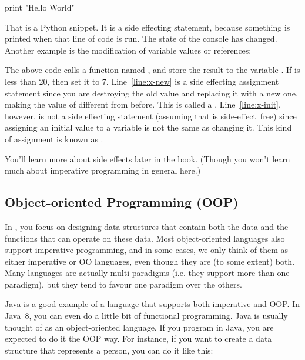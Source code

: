\begin{Python}
print "Hello World"
\end{Python}

That is a Python snippet. It is a side effecting statement, because something is printed when that line of code is run. The state of the console has changed. Another example is the modification of variable values or references: 

\begin{Python}
x = function_that_returns_int() (*@\label{line:x-init}@*)
if x < 20:
	x = 7 (*@{\label{line:x-new}@*)
\end{Python}

The above code calls a function named , and store the result to the variable . If  is less than 20, then set it to 7. Line~\ref{line:x-new} is a side effecting assignment statement since you are destroying the old value and replacing it with a new one, making the value of  different from before. This is called a . Line~\ref{line:x-init}, however, is not a side effecting statement (assuming that  is side-effect~free) since assigning an initial value to a variable is not the same as changing it. This kind of assignment is known as .

You'll learn more about side effects later in the book. (Though you won't learn much about imperative programming in general here.)

\subsection{Object-oriented Programming (OOP)}
In , you focus on designing data structures that contain both the data and the functions that can operate on these data. Most object-oriented languages also support imperative programming, and in some cases, we only think of them as either imperative  or OO languages, even though they are (to some extent) both. Many languages are actually multi-paradigms (i.e. they support more than one paradigm), but they tend to favour one paradigm over the others. 

Java is a good example of a language that supports both imperative and OOP. In Java~8, you can even do a little bit of functional programming. Java is usually thought of as an object-oriented language. If you program in Java, you are expected to do it the OOP way. For instance, if you want to create a data structure that represents a person, you can do it like this:

